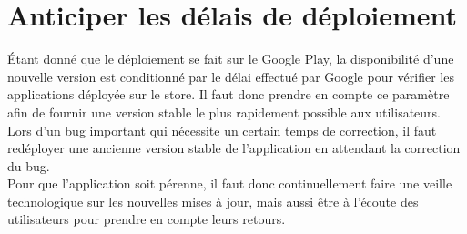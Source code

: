 \documentclass[UTF8]{EPURapport}
\begin{document}
\section{Anticiper les délais de déploiement}
Étant donné que le déploiement se fait sur le Google Play, la disponibilité d'une nouvelle version est conditionné par le délai effectué par Google pour vérifier les applications déployée sur le store. Il faut donc prendre en compte ce paramètre afin de fournir une version stable le plus rapidement possible aux utilisateurs. Lors d'un bug important qui nécessite un certain temps de correction, il faut redéployer une ancienne version stable de l'application en attendant la correction du bug.\\

Pour que l'application soit pérenne, il faut donc continuellement faire une veille technologique sur les nouvelles mises à jour, mais aussi être à l'écoute des utilisateurs pour prendre en compte leurs retours.
\end{document}
